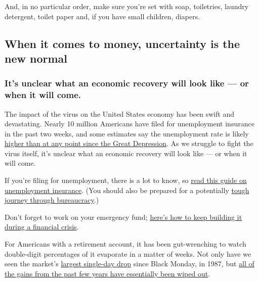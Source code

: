 And, in no particular order, make sure you're set with soap, toiletries,
laundry detergent, toilet paper and, if you have small children,
diapers.

\hypertarget{when-it-comes-to-money-uncertainty-is-the-new-normal}{%
\subsection{When it comes to money, uncertainty is the new
normal}\label{when-it-comes-to-money-uncertainty-is-the-new-normal}}

\hypertarget{its-unclear-what-an-economic-recovery-will-look-like--or-when-it-will-come}{%
\subsubsection{It's unclear what an economic recovery will look like ---
or when it will
come.}\label{its-unclear-what-an-economic-recovery-will-look-like--or-when-it-will-come}}

The impact of the virus on the United States economy has been swift and
devastating. Nearly 10 million Americans have filed for unemployment
insurance in the past two weeks, and some estimates say the unemployment
rate is likely
\href{https://www.nytimes.com/2020/04/03/upshot/coronavirus-jobless-rate-great-depression.html}{higher
than at any point since the Great Depression}. As we struggle to fight
the virus itself, it's unclear what an economic recovery will look like
--- or when it will come.

If you're filing for unemployment, there is a lot to know, so
\href{https://www.nytimes.com/2020/03/17/your-money/unemployment-insurance-coronavirus.html}{read
this guide on unemployment insurance}. (You should also be prepared for
a potentially
\href{https://www.nytimes.com/2020/04/04/nyregion/coronavirus-ny-unemployment-benefits.html}{tough
journey through bureaucracy}.)

Don't forget to work on your emergency fund;
\href{https://www.nytimes.com/2020/03/20/your-money/coronavirus-emergency-fund.html}{here's
how to keep building it during a financial crisis}.

For Americans with a retirement account, it has been gut-wrenching to
watch double-digit percentages of it evaporate in a matter of weeks. Not
only have we seen the market's
\href{https://www.nytimes.com/2020/03/16/business/stock-market-drops-recap.html\#link-7c85d039}{largest
single-day drop} since Black Monday, in 1987, but
\href{https://www.nytimes.com/2020/03/20/business/coronavirus-trump-stock-market.html}{all
of the gains from the past few years have essentially been wiped out}.

